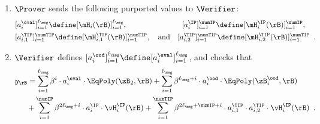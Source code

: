 \begin{tcolorbox}[breakable, enhanced, colback=white, boxrule=0.65pt]
        \begin{enumerate}[nolistsep]
        \item $\Prover$ sends the following purported values to $\Verifier$: 
        \begin{align*}
            &[a^{\eval}_i]_{i=1}^{\ell_{\msg}} \define [\mH_i(\rB)]_{i=1}^{\ell_{\msg}}, \quad \quad \quad \quad \quad \; \quad \; \; \: \; [a^{\IP}_i]_{i=1}^{\numIP} \define [\mH^{\IP}_i(\rB)]_{i=1}^{\numIP}, \\
            &[a^{\TIP}_{i,1}]_{i=1}^{\numTIP} \define [\mH^{\TIP}_{i,1}(\rB)]_{i=1}^{\numTIP}, \quad \text{and} \quad  [a^{\TIP}_{i,2}]_{i=1}^{\numTIP} \define [\mH^{\TIP}_{i,2}(\rB)]_{i=1}^{\numTIP} \enspace .
        \end{align*}
        \item $\Verifier$ defines $[a^{\ood}_i]_{i=1}^{\ell_{\msg}} \define [a^{\eval}_i]_{i=1}^{\ell_{\msg}}$, and checks that
        \begin{align*}
            &y_{\rB} = \sum_{i=1}^{\ell_{\msg}} \beta^{i} \cdot a^{\eval}_i \cdot \EqPoly(\zB_2, \rB) + \sum_{i=1}^{\ell_{\msg}} \beta^{\ell_{\msg} + i} \cdot a^{\ood}_i \cdot \EqPoly(\zB^{\ood}_i, \rB) \\
            &\quad \; \; + \sum_{i=1}^{\numIP} \beta^{2\ell_{\msg} + i} \cdot a^{\IP}_i \cdot \vH^{\IP}_i(\rB) + \sum_{i=1}^{\numTIP} \beta^{2\ell_{\msg} + \numIP + i} \cdot a^{\TIP}_{i,1} \cdot a^{\TIP}_{i,2} \cdot \vH^{\IP}_i(\rB) \enspace .
        \end{align*}
        \end{enumerate}


\end{tcolorbox}
